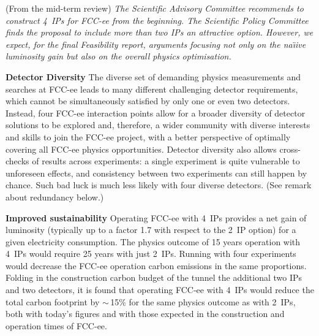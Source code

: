 \begin{tcolorbox}[colback=green!5!white,
                  colframe=green!75!black,
                  title=The benefits of four interaction points
                 ]
\footnotesize (From the mid-term review) 
{\it The Scientific Advisory Committee recommends to construct 4~IPs for FCC-ee from the beginning. 
The Scientific Policy Committee finds the proposal to include more than two IPs an attractive option. 
However, we expect, for the final Feasibility report, arguments focusing not only on the na{\"\i}ive luminosity gain but also on the overall physics optimisation.}
\tcblower
\footnotesize

{\bf Detector Diversity}
The diverse set of demanding physics measurements and searches at FCC-ee leads to many different challenging detector requirements, which cannot be simultaneously satisfied by only one or even two detectors. 
Instead, four FCC-ee interaction points allow for a broader diversity of detector solutions to be explored and, therefore, a wider community with diverse interests and skills to join the FCC-ee project, with a better perspective of optimally covering all FCC-ee physics opportunities. 
Detector diversity also allows cross-checks of results across experiments: a single experiment is quite vulnerable to unforeseen effects, and consistency between two experiments can still happen by chance. 
Such bad luck is much less likely with four diverse detectors. 
(See remark about redundancy below.)  

{\bf Improved sustainability} 
Operating FCC-ee with 4~IPs provides a net gain of luminosity (typically up to a factor 1.7 with respect to the 2~IP option) for a given electricity consumption. 
The physics outcome of 15 years operation with 4~IPs would require 25 years with just 2~IPs. 
Running with four experiments would decrease the FCC-ee operation carbon emissions in the same proportions. Folding in the construction carbon budget of the tunnel the additional two IPs and two detectors, it is found that operating FCC-ee with 4~IPs would reduce the total carbon footprint by $\sim$\,15\% for the same physics outcome as with 2~IPs, both with today's figures and with those expected in the construction and operation times of FCC-ee.


\end{tcolorbox}
